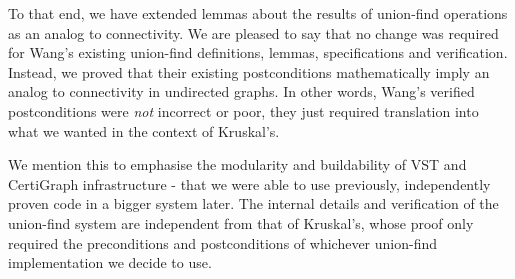 To that end, we have extended lemmas about the results of union-find operations as an analog to connectivity. We are pleased to say that no change was required for Wang's existing union-find definitions, lemmas, specifications and verification. Instead, we proved that their existing postconditions mathematically imply an analog to connectivity in undirected graphs. In other words, Wang's verified postconditions were \textit{not} incorrect or poor, they just required translation into what we wanted in the context of Kruskal's.

We mention this to emphasise the modularity and buildability of VST and CertiGraph infrastructure - that we were able to use previously, independently proven code in a bigger system later. The internal details and verification of the union-find system are independent from that of Kruskal's, whose proof only required the preconditions and postconditions of whichever union-find implementation we decide to use.